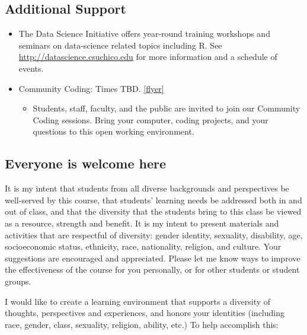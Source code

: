 \documentclass[
  11pt,
]{article}
\providecommand{\tightlist}{%
  \setlength{\itemsep}{0pt}\setlength{\parskip}{0pt}}
\begin{document}
\hypertarget{additional-support}{%
\subsection{Additional Support}\label{additional-support}}

\begin{itemize}
\tightlist
\item
  The Data Science Initiative offers year-round training workshops and
  seminars on data-science related topics including R. See
  \url{http://datascience.csuchico.edu} for more information and a
  schedule of events.
\item
  Community Coding: Times TBD. \href{cc_flyer.pdf}{{[}flyer{]}}

  \begin{itemize}
  \tightlist
  \item
    Students, staff, faculty, and the public are invited to join our
    Community Coding sessions. Bring your computer, coding projects, and
    your questions to this open working environment.
  \end{itemize}
\end{itemize}

\hypertarget{everyone-is-welcome-here}{%
\subsection{Everyone is welcome here}\label{everyone-is-welcome-here}}

It is my intent that students from all diverse backgrounds and
perspectives be well-served by this course, that students' learning
needs be addressed both in and out of class, and that the diversity that
the students bring to this class be viewed as a resource, strength and
benefit. It is my intent to present materials and activities that are
respectful of diversity: gender identity, sexuality, disability, age,
socioeconomic status, ethnicity, race, nationality, religion, and
culture. Your suggestions are encouraged and appreciated. Please let me
know ways to improve the effectiveness of the course for you personally,
or for other students or student groups.

I would like to create a learning environment that supports a diversity
of thoughts, perspectives and experiences, and honors your identities
(including race, gender, class, sexuality, religion, ability, etc.) To
help accomplish this:
\end{document}
